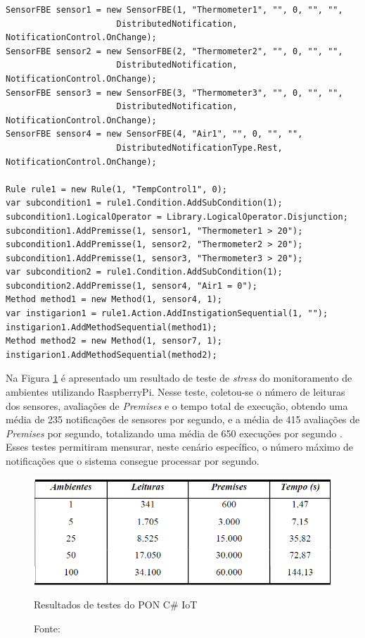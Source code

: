 \begin{lstlisting}[caption = {Exemplo de \textit{Rule} com o \textit{Framework} PON C\# IoT},
  source = {Adaptado de \citeonline{msc_oliveira_2019}}, float=htb,
  label = {cod:rule_iot}]
SensorFBE sensor1 = new SensorFBE(1, "Thermometer1", "", 0, "", "", 
                      DistributedNotification, NotificationControl.OnChange);
SensorFBE sensor2 = new SensorFBE(2, "Thermometer2", "", 0, "", "",
                      DistributedNotification, NotificationControl.OnChange);
SensorFBE sensor3 = new SensorFBE(3, "Thermometer3", "", 0, "", "", 
                      DistributedNotification, NotificationControl.OnChange);
SensorFBE sensor4 = new SensorFBE(4, "Air1", "", 0, "", "", 
                      DistributedNotificationType.Rest, NotificationControl.OnChange);

Rule rule1 = new Rule(1, "TempControl1", 0);
var subcondition1 = rule1.Condition.AddSubCondition(1);
subcondition1.LogicalOperator = Library.LogicalOperator.Disjunction;
subcondition1.AddPremisse(1, sensor1, "Thermometer1 > 20");
subcondition1.AddPremisse(1, sensor2, "Thermometer2 > 20");
subcondition1.AddPremisse(1, sensor3, "Thermometer3 > 20");
var subcondition2 = rule1.Condition.AddSubCondition(1);
subcondition2.AddPremisse(1, sensor4, "Air1 = 0");
Method method1 = new Method(1, sensor4, 1);
var instigarion1 = rule1.Action.AddInstigationSequential(1, "");
instigarion1.AddMethodSequential(method1);
Method method2 = new Method(1, sensor7, 1);
instigarion1.AddMethodSequential(method2);
\end{lstlisting}

Na Figura \ref{fig:teste_pon_iot} é apresentado um resultado de teste de
\textit{stress} do monitoramento de ambientes utilizando RaspberryPi. Nesse
teste, coletou-se o número de leituras dos sensores, avaliações de
\textit{Premises} e o tempo total de execução, obtendo uma média de 235
notificações de sensores por segundo, e a média de 415 avaliações de
\textit{Premises} por segundo, totalizando uma média de 650 execuções por
segundo . Esses testes permitiram mensurar, neste
cenário específico, o número máximo de notificações que o sistema consegue
processar por segundo.

\begin{figure}[!htb]
  \centering
  \includegraphics[width=.75\textwidth]{../figures/teste_pon_iot.png}
  \caption{Resultados de testes do PON C\# IoT}
  \caption*{Fonte: }
  \label{fig:teste_pon_iot}
\end{figure}

